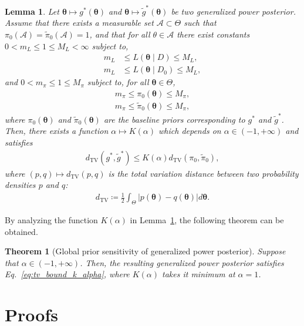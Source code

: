 \documentclass[12pt]{article}
\newtheorem{theorem}{Theorem}
\newtheorem{lemma}{Lemma}
\begin{document}
\begin{lemma}
    \label{lem:bound_total_variation_distance}
    Let $\bm{\theta} \mapsto g^*(\bm{\theta})$ and $\bm{\theta} \mapsto \tilde{g}^*(\bm{\theta})$ be two generalized power posterior.
    Assume that there exists a measurable set $\mathcal{A} \subset \Theta$ such that $\pi_0(\mathcal{A}) = \tilde{\pi}_0(\mathcal{A}) = 1$, and that for all $\theta \in \mathcal{A}$ there exist constants $0 < m_L \leq 1 \leq M_L < \infty$ subject to,
    \begin{align*}
        m_L &\leq L(\bm{\theta} \mid D) \leq M_L, \\
        m_L &\leq L(\bm{\theta} \mid D_0) \leq M_L,
    \end{align*}
    and $0 < m_\pi \leq 1 \leq M_\pi$ subject to, for all $\bm{\theta} \in \Theta$,
    \begin{align*}
        m_\pi \leq \pi_0(\bm{\theta}) \leq M_\pi, \\
        m_\pi \leq \tilde{\pi}_0(\bm{\theta}) \leq M_\pi,
    \end{align*}
    where $\pi_0(\bm{\theta})$ and $\tilde{\pi}_0(\bm{\theta})$ are the baseline priors corresponding to $g^*$ and $\tilde{g}^*$.
    Then, there exists a function $\alpha \mapsto K(\alpha)$ which depends on $\alpha \in (-1, +\infty)$ and satisfies
    \begin{align}
        d_{\mathrm{TV}}(g^*, \tilde{g}^*) \leq K(\alpha) d_{\mathrm{TV}}(\pi_0, \tilde{\pi}_0), \label{eq:tv_bound_k_alpha}
    \end{align}
    where $(p, q) \mapsto d_{\mathrm{TV}}(p, q)$ is the total variation distance between two probability densities $p$ and $q$:
    \begin{align*}
        d_{\mathrm{TV}} \coloneqq \frac{1}{2}\int_\Theta \left|p(\bm{\theta}) - q(\bm{\theta}) \right| d\bm{\theta}.
    \end{align*}
\end{lemma}
By analyzing the function $K(\alpha)$ in Lemma~\ref{lem:bound_total_variation_distance}, the following theorem can be obtained.
\begin{theorem}[Global prior sensitivity of generalized power posterior]
    \label{thm:global_prior_sensitivity}
    Suppose that $\alpha \in (-1, +\infty)$.
    Then, the resulting generalized power posterior satisfies Eq.~\eqref{eq:tv_bound_k_alpha}, where $K(\alpha)$ takes it minimum at $\alpha = 1$.
\end{theorem}

\section{Proofs}
\label{sec:proofs}
\end{document}
